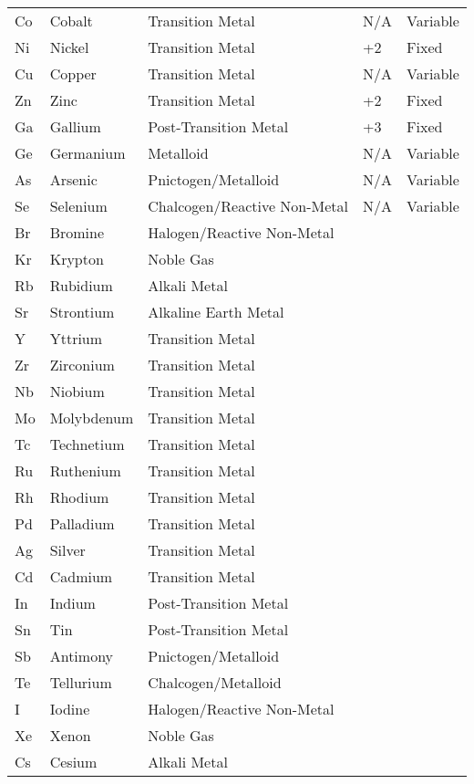 \begin{center}
\begin{longtable}{|l|l|l|l|l|}
Co 	& Cobalt 		& Transition Metal 					& N/A		& Variable		\\
Ni 	& Nickel 		& Transition Metal 					& +2		& Fixed 		\\
Cu 	& Copper 		& Transition Metal 					& N/A 		& Variable		\\
Zn 	& Zinc 			& Transition Metal 					& +2		& Fixed			\\
Ga 	& Gallium 		& Post-Transition Metal 			& +3		& Fixed 		\\
Ge 	& Germanium 	& Metalloid 						& N/A 		& Variable		\\
As 	& Arsenic 		& Pnictogen/Metalloid 				& N/A		& Variable		\\
Se 	& Selenium 		& Chalcogen/Reactive Non-Metal		& N/A		& Variable		\\
Br 	& Bromine 		& Halogen/Reactive Non-Metal		& & \\
Kr 	& Krypton 		& Noble Gas							& & \\
Rb 	& Rubidium 		& Alkali Metal 						& & \\
Sr 	& Strontium 	& Alkaline Earth Metal				& & \\
Y 	& Yttrium 		& Transition Metal					& & \\
Zr 	& Zirconium 	& Transition Metal					& & \\
Nb 	& Niobium 		& Transition Metal					& & \\
Mo 	& Molybdenum	& Transition Metal					& & \\
Tc 	& Technetium	& Transition Metal					& & \\
Ru 	& Ruthenium 	& Transition Metal					& & \\
Rh 	& Rhodium		& Transition Metal					& & \\
Pd 	& Palladium 	& Transition Metal					& & \\
Ag 	& Silver 		& Transition Metal					& & \\
Cd 	& Cadmium 		& Transition Metal					& & \\
In 	& Indium 		& Post-Transition Metal				& & \\
Sn 	& Tin 			& Post-Transition Metal				& & \\
Sb 	& Antimony 		& Pnictogen/Metalloid				& & \\
Te 	& Tellurium 	& Chalcogen/Metalloid				& & \\
I 	& Iodine 		& Halogen/Reactive Non-Metal		& & \\
Xe 	& Xenon 		& Noble Gas							& & \\
Cs 	& Cesium 		& Alkali Metal						& & \\

\end{longtable}
\end{center}
